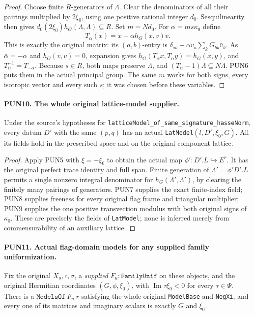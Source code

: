 \begin{proof}
Choose finite \(R\)-generators of \(\Lambda\).  Clear the
denominators of all their pairings multiplied by \(2\xi_0\),
using one positive rational integer \(d_0\).  Sesquilinearity
then gives
\(d_0(2\xi_0)h_G(\Lambda,\Lambda)\subseteq R\).
Set \(m=N d_0\).  For \(\alpha=ms\kappa_0\) define
\[
        T_\alpha(x)=x+\alpha h_G(x,v)v.
 \tag{PUN.10}
\]
This is exactly the original matrix: its \((a,b)\)-entry is
\(\delta_{ab}+\alpha v_a\sum_kG_{bk}\bar v_k\).
As \(\bar\alpha=-\alpha\) and \(h_G(v,v)=0\), expansion
gives \(h_G(T_\alpha x,T_\alpha y)=h_G(x,y)\), and
\(T_\alpha^{-1}=T_{-\alpha}\).  Because \(s\in R\), both
maps preserve \(\Lambda\), and
\((T_\alpha-1)\Lambda\subseteq N\Lambda\).
PUN6 puts them in the actual principal group.  The same \(m\)
works for both signs, every isotropic vector and every such \(s\);
it was chosen before these variables.
\end{proof}

\paragraph{PUN10. The whole original lattice-model supplier.}
\label{claim:PUN10}
Under the source's hypotheses for
\texttt{latticeModel\_of\_same\_signature\_hasseNorm}, every
datum \(D'\) with the same \((p,q)\) has an actual
\texttt{LatModel}\((l,D',\xi_0,G)\).  All its fields hold in
the prescribed space and on the original component lattice.

\begin{proof}
Apply PUN5 with \(\xi=-\xi_0\) to obtain the actual map
\(\phi':D'.L\hookrightarrow E^r\).  It has the original
perfect trace identity and full span.  Finite generation of
\(\Lambda'=\phi'D'.L\) permits a single nonzero integral
denominator for \(h_G(\Lambda',\Lambda')\), by clearing the
finitely many pairings of generators.  PUN7 supplies the exact
finite-index field; PUN8 supplies freeness for every original
flag frame and triangular multiplier; PUN9 supplies the one
positive transvection modulus with both original signs of
\(\kappa_0\).  These are precisely the fields of
\texttt{LatModel}; none is inferred merely from commensurability
of an auxiliary lattice.
\end{proof}

\paragraph{PUN11. Actual flag-domain models for any supplied family uniformization.}
\label{claim:PUN11}
Fix the original \(X_o,c,\sigma\), a \emph{supplied}
\(F_u:\texttt{FamilyUnif}\) on these objects, and the original
Hermitian coordinates \((G,\phi,\xi_0)\), with
\(\operatorname{Im}\tau\xi_0<0\) for every \(\tau\in\Psi\).
There is a \(\texttt{ModelsOf}\ F_u\ r\) satisfying the
whole original \texttt{ModelBase} and \texttt{NegXi}, and every
one of its matrices and imaginary scalars is exactly \(G\) and
\(\xi_0\).

